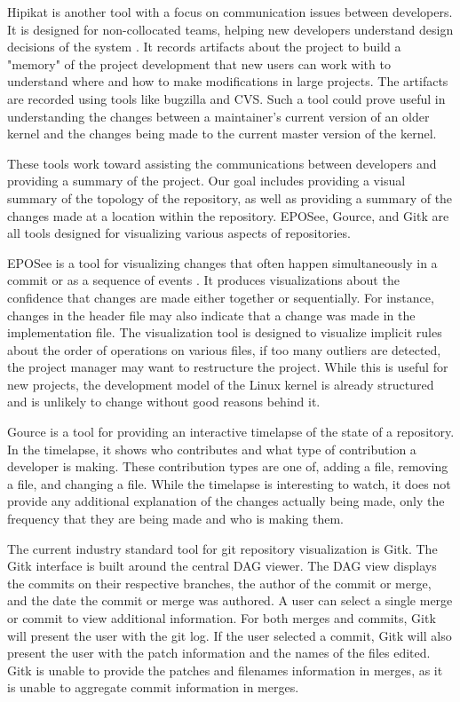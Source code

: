 \documentclass[conference, draftclsnofoot, draft]{IEEEtran}
\begin{document}
Hipikat is another tool with a focus on communication issues between developers. It
is designed for non-collocated teams, helping new developers understand design
decisions of the system \cite{Cubranic2005}. It records artifacts about the project
to build a "memory" of the project development that new users can work with to
understand where and how to make modifications in large projects. The artifacts are
recorded using tools like bugzilla and CVS. Such a tool could prove useful in
understanding the changes between a maintainer's current version of an older kernel
and the changes being made to the current master version of the kernel.

These tools work toward assisting the communications between developers and
providing a summary of the project. Our goal includes providing a visual summary of
the topology of the repository, as well as providing a summary of the changes made
at a location within the repository. EPOSee, Gource, and Gitk are all tools designed
for visualizing various aspects of repositories.

EPOSee is a tool for visualizing changes that often happen simultaneously in a
commit or as a sequence of events \cite{Burch2005}. It produces visualizations about
the confidence that changes are made either together or sequentially. For instance,
changes in the header file may also indicate that a change was made in the
implementation file. The visualization tool is designed to visualize implicit rules
about the order of operations on various files, if too many outliers are detected,
the project manager may want to restructure the project.  While this is useful for
new projects, the development model of the Linux kernel is already structured and is
unlikely to change without good reasons behind it.

Gource is a tool for providing an interactive timelapse of the state of a
repository\cite{Caudwell2010}. In the timelapse, it shows who contributes and what
type of contribution a developer is making. These contribution types are one of,
adding a file, removing a file, and changing a file. While the timelapse is
interesting to watch, it does not provide any additional explanation of the changes
actually being made, only the frequency that they are being made and who is making
them.

The current industry standard tool for git repository visualization is Gitk. The
Gitk interface is built around the central DAG viewer. The DAG view displays the
commits on their respective branches, the author of the commit or merge, and the
date the commit or merge was authored. A user can select a single merge or commit
to view additional information. For both merges and commits, Gitk will present the
user with the git log. If the user selected a commit, Gitk will also present the
user with the patch information and the names of the files edited. Gitk is unable to
provide the patches and filenames information in merges, as it is unable to
aggregate commit information in merges.
\end{document}
